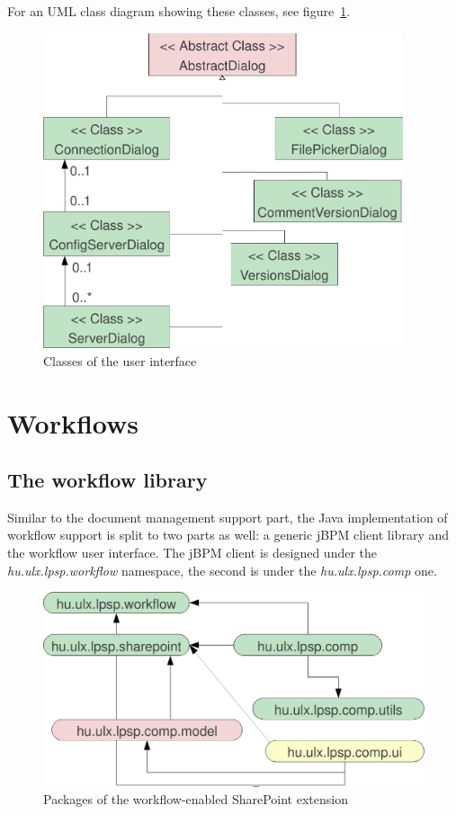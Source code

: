 For an UML class diagram showing these classes, see figure~\ref{fig:design-spui}.

\begin{figure}[p]
\centering
\includegraphics[width=400px,keepaspectratio]{design-spui.pdf}
\caption{Classes of the user interface}
\label{fig:design-spui}
\end{figure}

\section{Workflows}

\subsection{The workflow library}

Similar to the document management support part, the Java implementation of
workflow support is split to two parts as well: a generic jBPM client library
and the workflow user interface. The jBPM client is designed under the
\emph{hu.ulx.lpsp.workflow} namespace, the second is under the
\emph{hu.ulx.lpsp.comp} one.

\begin{figure}[H]
\centering
\includegraphics[width=425px,keepaspectratio]{design-packages-wf.pdf}
\caption{Packages of the workflow-enabled SharePoint extension}
\label{fig:design-packages-wf}
\end{figure}


